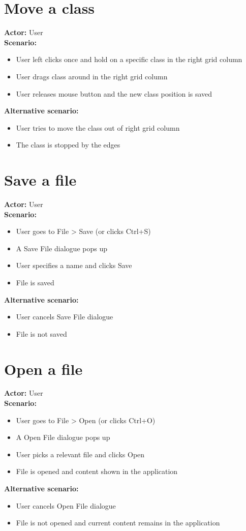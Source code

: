 \section{Move a class}
\textbf{Actor:} User\\
\textbf{Scenario:}
\begin{itemize}
\item User left clicks once and hold on a specific class in the right grid column
\item User drags class around in the right grid column
\item User releases mouse button and the new class position is saved
\end{itemize}
\textbf{Alternative scenario:} 
\begin{itemize}
\item User tries to move the class out of right grid column
\item The class is stopped by the edges 
\end{itemize}

\section{Save a file}
\textbf{Actor:} User\\
\textbf{Scenario:}
\begin{itemize}
\item User goes to File > Save (or clicks Ctrl+S)
\item A Save File dialogue pops up
\item User specifies a name and clicks Save
\item File is saved
\end{itemize}
\textbf{Alternative scenario:} 
\begin{itemize}
\item User cancels Save File dialogue
\item File is not saved 
\end{itemize}

\section{Open a file}
\textbf{Actor:} User\\
\textbf{Scenario:}
\begin{itemize}
\item User goes to File > Open (or clicks Ctrl+O)
\item A Open File dialogue pops up
\item User picks a relevant file and clicks Open
\item File is opened and content shown in the application
\end{itemize}
\textbf{Alternative scenario:} 
\begin{itemize}
\item User cancels Open File dialogue
\item File is not opened and current content remains in the application 
\end{itemize}

